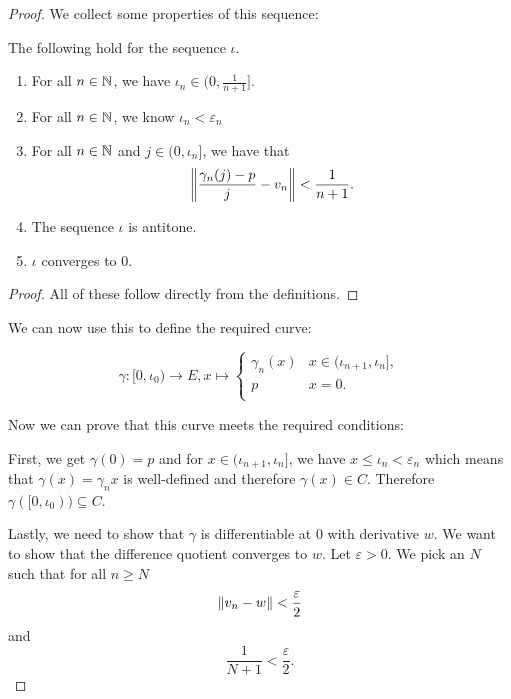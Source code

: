 \begin{proof}
We collect some properties of this sequence: 

\begin{claim} The following hold for the sequence $\iota$. \label{claim:sequenceProps}
\begin{enumerate}
    \item For all $n \in \mathbb{N}$, we have $\iota_n \in \bigl(0, \frac{1}{n + 1}\bigr]$. 
    \item For all $n \in \mathbb{N}$, we know $\iota_n < \varepsilon_n$
    \item \label{point:normLT} For all $n \in \mathbb{N}$ and $j \in (0, \iota_n]$, we have that 
        \begin{equation*}
            \left\lVert\frac{\gamma_n(j) - p}{j} - v_n\right\rVert < \frac{1}{n + 1}.
        \end{equation*} 
    \item The sequence $\iota$ is antitone. 
    \item $\iota$ converges to $0$. 
\end{enumerate}
\begin{proof}
All of these follow directly from the definitions.
\end{proof}
\end{claim}

We can now use this to define the required curve: 

\begin{equation*}
\gamma \colon [0, \iota_0) \to E, x \mapsto \begin{cases} \gamma_n (x) & x \in (\iota_{n + 1}, \iota_n],\\ 
p & x = 0.\\
\end{cases}
\end{equation*}

Now we can prove that this curve meets the required conditions: 

First, we get $\gamma(0) = p$ and for $x \in (\iota_{n + 1}, \iota_n]$, we have $x \le \iota_n < \varepsilon_n$ which means that $\gamma(x) = \gamma_n{x}$ is well-defined and therefore $\gamma(x) \in C$.
Therefore $\gamma([0, \iota_0)) \subseteq C$. 

Lastly, we need to show that $\gamma$ is differentiable at $0$ with derivative $w$.
We want to show that the difference quotient converges to $w$.
Let $\varepsilon > 0$. 
We pick an $N$ such that for all $n \ge N$
\begin{equation*}
    \left\lVert v_n - w\right\rVert < \frac{\varepsilon}{2}    
\end{equation*}
and 
\begin{equation*}
    \frac{1}{N + 1} < \frac{\varepsilon}{2}.
\end{equation*}


\end{proof}
